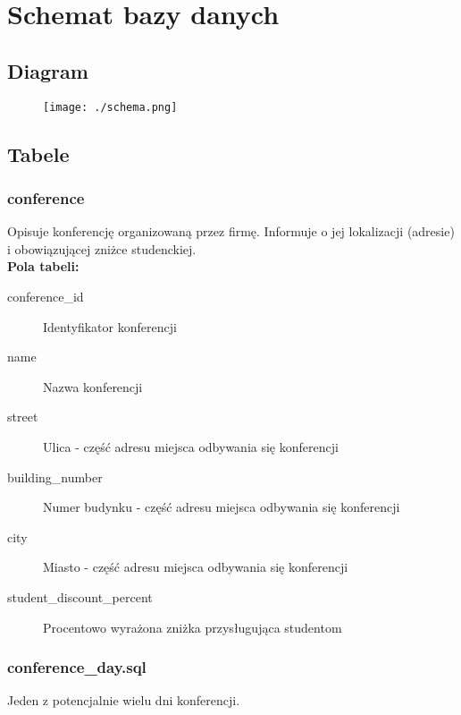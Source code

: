 \documentclass[12pt]{article}
\begin{document}
\section{Schemat bazy danych}


\subsection{Diagram}
\begin{figure}[H]
\centering
\texttt{[image: ./schema.png]}
\end{figure}


\subsection{Tabele}

\subsubsection{conference}

Opisuje konferencję organizowaną przez firmę. Informuje o jej lokalizacji (adresie) i obowiązującej zniżce studenckiej. \\

\textbf{Pola tabeli:}
\begin{description}
\item [conference\_id] Identyfikator konferencji
\item [name] Nazwa konferencji
\item [street] Ulica - część adresu miejsca odbywania się konferencji
\item [building\_number] Numer budynku - część adresu miejsca odbywania się konferencji
\item [city] Miasto - część adresu miejsca odbywania się konferencji
\item [student\_discount\_percent] Procentowo wyrażona zniżka przysługująca studentom
\end{description}



\subsubsection{conference\_day.sql}

Jeden z potencjalnie wielu dni konferencji. \\
\end{document}
